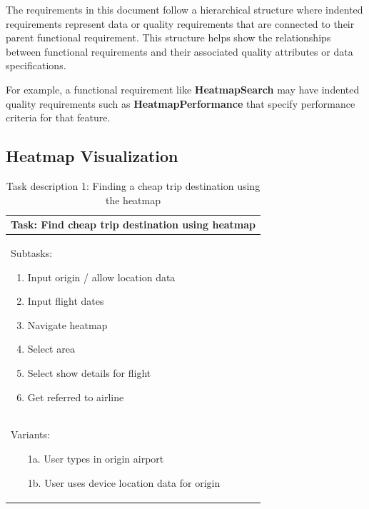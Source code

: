 The requirements in this document follow a hierarchical structure where indented requirements represent data or quality requirements that are connected to their parent functional requirement. This structure helps show the relationships between functional requirements and their associated quality attributes or data specifications.

For example, a functional requirement like \textbf{HeatmapSearch} may have indented quality requirements such as \textbf{HeatmapPerformance} that specify performance criteria for that feature.

\subsection{Heatmap Visualization}

\begin{table}[H]
\begin{tabular}{|p{}|}
    \hline
    \textbf{Task: Find cheap trip destination using heatmap}\\
    \hline
    Subtasks:
    \begin{enumerate}
        \item Input origin / allow location data
        \item Input flight dates
        \item Navigate heatmap
        \item Select area
        \item Select show details for flight
        \item Get referred to airline
    \end{enumerate}\\
    \hline
    Variants:
    \begin{enumerate}
        \item[1a.] User types in origin airport
        \item[1b.] User uses device location data for origin
    \end{enumerate}\\
    \hline
\end{tabular}
\caption*{Task description 1: Finding a cheap trip destination using the heatmap}
\end{table}

